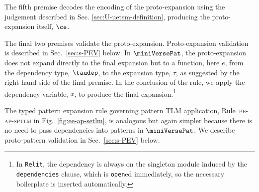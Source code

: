 \documentclass[acmsmall]{acmart}
\newcommand{\lifootnote}[1]{\lstinline[basicstyle=\ttfamily\fontsize{7pt}{1em}\selectfont]{#1}}
\begin{document}
The fifth premise decodes the encoding of the proto-expansion using the judgement described in Sec. \ref{sec:U-uetsm-definition}, producing the proto-expansion itself, $\ce$. 

The final two premises validate the proto-expansion. Proto-expansion validation is described in Sec.~\ref{sec:s-PEV} below. In $\miniVersePat$, the proto-expansion does not expand directly to the final expansion but to a function, here $e$, from the dependency type, $\taudep$, to the expansion type, $\tau$, as suggested by the right-hand side of the final premise. In the conclusion of the rule, we apply the dependency variable, $x$, to produce the final expansion.\footnote{In \lifootnote{Relit}, the dependency is always on the singleton module induced by the \lifootnote{dependencies} clause, which is \lifootnote{open}ed immediately, so the necessary boilerplate is inserted automatically.%
}

The typed pattern expansion rule governing pattern TLM application, Rule~\textsc{pe-ap-sptlm} in Fig.~\ref{fig:ee-ap-setlm}, is analogous but again simpler because there is no need to pass dependencies into patterns in $\miniVersePat$.
We describe proto-pattern validation in Sec.~\ref{sec:s-PEV} below.
\end{document}
